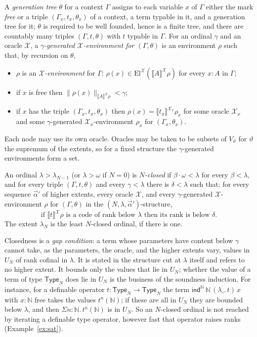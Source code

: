 \documentclass[10pt]{article}
\newcommand{\N}{\mathbb{N}}
\newcommand{\Type}{\mathsf{Type}}
\newcommand{\sem}[1]{\llbracket #1\rrbracket}
\newcommand{\El}{\mathrm{El}}
\newcommand{\X}{\mathcal{X}}
\newcommand{\ind}{\mathsf{ind}}
\begin{document}
\begin{definition}\label{def:gen}
A \emph{generation tree} $\theta$ for a context $\Gamma$ assigns to each
variable $x$ of $\Gamma$ either the mark \emph{free} or a triple
$(\Gamma_x,t_x,\theta_x)$ of a context, a term typable in it, and a
generation tree for it; $\theta$ is required to be well founded, hence is
a finite tree, and there are countably many triples $(\Gamma,t,\theta)$
with $t$ typable in $\Gamma$. For an ordinal $\gamma$ and an oracle $\X$, a
\emph{$\gamma$-generated $\X$-environment for $(\Gamma,\theta)$} is an
environment $\rho$ such that, by recursion on $\theta$,
\begin{itemize}
\item $\rho$ is an \emph{$\X$-environment} for $\Gamma$:
  $\rho(x)\in\El^\X(\sem A^\X\rho)$ for every $x{:}A$ in $\Gamma$;
\item if $x$ is free then $\|\rho(x)\|_{\sem A^\X\rho}<\gamma$;
\item if $x$ has the triple $(\Gamma_x,t_x,\theta_x)$ then
  $\rho(x)=\sem{t_x}^{\X_x}\rho_x$ for some oracle $\X_x$ and some
  $\gamma$-generated $\X_x$-environment $\rho_x$ for $(\Gamma_x,\theta_x)$.
\end{itemize}
Each node may use its own oracle. Oracles may be taken to be subsets of
$V_\vartheta$ for $\vartheta$ the supremum of the extents, so for a fixed
structure the $\gamma$-generated environments form a set.
\end{definition}

\begin{definition}\label{def:closedord}
An ordinal $\lambda>\lambda_{N-1}$ (or $\lambda>\omega$ if $N=0$) is
\emph{$N$-closed} if $\beta\cdot\omega<\lambda$ for every $\beta<\lambda$,
and for every triple $(\Gamma,t,\theta)$ and every $\gamma<\lambda$ there
is $\delta<\lambda$ such that: for every sequence $\vec\alpha'$ of higher
extents, every oracle $\X$, and every $\gamma$-generated $\X$-environment
$\rho$ for $(\Gamma,\theta)$ in the $(N,\lambda,\vec\alpha')$-structure,
\[
\text{if }\sem t^\X\rho\text{ is a code of rank below }\lambda
\text{ then its rank is below }\delta.
\]
The extent $\lambda_N$ is the least $N$-closed ordinal, if there is one.
\end{definition}

Closedness is a \emph{gap condition}: a term whose parameters have
content below $\gamma$ cannot take, as the parameters, the oracle, and the
higher extents vary, values in $U_N$ of rank cofinal in $\lambda$. It is
stated in the structure cut at $\lambda$ itself and refers to no higher
extent. It bounds only the values that lie in $U_N$; whether the value
of a term of type $\Type_N$ does lie in $U_N$ is the business of the
soundness induction. For instance, for a definable operator
$t:\Type_N\to\Type_N$ the term $\ind^\N\,\N\,(\lambda\_.\,t)\,x$ with $x{:}\N$
free takes the values $t^n(\N)$; if these are all in $U_N$ they are
bounded below $\lambda$, and then $\Sigma n{:}\N.\,t^n(\N)$ is in $U_N$.
So an $N$-closed ordinal is not reached by iterating a definable type
operator, however fast that operator raises ranks
(Example~\ref{ex:sat}).
\end{document}
